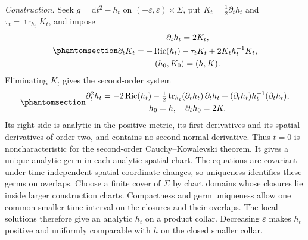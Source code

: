 \documentclass[
  english,
  11pt,
  reqno]{amsart}
\begin{document}
\emph{Construction.} Seek \(g=\mathrm dt^2-h_t\) on
\((-\varepsilon,\varepsilon)\times\Sigma\), put
\(K_t=\tfrac12\partial_t h_t\) and
\(\tau_t=\operatorname{tr}_{h_t}K_t\), and impose
\begin{equation}\protect\phantomsection\label{eq:classical-analytic-gaussian-evolution}{\begin{gathered}
\partial_t h_t=2K_t, \\
\partial_t K_t=-\operatorname{Ric}(h_t)-\tau_tK_t
+2K_th_t^{-1}K_t, \\
(h_0,K_0)=(h,K).
\end{gathered}}\end{equation} Eliminating \(K_t\) gives the second-order system
\begin{equation}\protect\phantomsection\label{eq:classical-analytic-gaussian-ck}{\begin{gathered}
\partial_t^2h_t=-2\operatorname{Ric}(h_t)
-\tfrac12\operatorname{tr}_{h_t}(\partial_t h_t)\,\partial_t h_t
+(\partial_t h_t)h_t^{-1}(\partial_t h_t), \\
h_0=h,\quad \partial_t h_0=2K.
\end{gathered}}\end{equation} Its right side is analytic in the positive metric, its
first derivatives and its spatial derivatives of order two, and contains
no second normal derivative. Thus \(t=0\) is noncharacteristic for the
second-order Cauchy--Kowalevski theorem. It gives a unique analytic germ
in each analytic spatial chart. The equations are covariant under
time-independent spatial coordinate changes, so uniqueness identifies
these germs on overlaps. Choose a finite cover of \(\Sigma\) by chart
domains whose closures lie inside larger construction charts.
Compactness and germ uniqueness allow one common smaller time interval
on the closures and their overlaps. The local solutions therefore give
an analytic \(h_t\) on a product collar. Decreasing \(\varepsilon\)
makes \(h_t\) positive and uniformly comparable with \(h\) on the closed
smaller collar.
\end{document}
